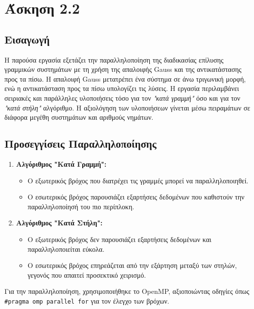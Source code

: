 \documentclass{article}
\begin{document}
\section*{Άσκηση 2.2}
\subsection*{Εισαγωγή} 
Η παρούσα εργασία εξετάζει την παραλληλοποίηση της διαδικασίας επίλυσης γραμμικών συστημάτων με τη χρήση της απαλοιφής Gauss και της αντικατάστασης προς τα πίσω. Η απαλοιφή Gauss μετατρέπει ένα σύστημα σε άνω τριγωνική μορφή, ενώ η αντικατάσταση προς τα πίσω υπολογίζει τις λύσεις. Η εργασία περιλαμβάνει σειριακές και παράλληλες υλοποιήσεις τόσο για τον \textit{"κατά γραμμή"} όσο και για τον \textit{"κατά στήλη"} αλγόριθμο. Η αξιολόγηση των υλοποιήσεων γίνεται μέσω πειραμάτων σε διάφορα μεγέθη συστημάτων και αριθμούς νημάτων.
\subsection*{Προσεγγίσεις Παραλληλοποίησης} 
\begin{enumerate} 
    \item \textbf{Αλγόριθμος "Κατά Γραμμή":} 
    \begin{itemize} 
        \item Ο εξωτερικός βρόχος που διατρέχει τις γραμμές μπορεί να παραλληλοποιηθεί. 
        \item Ο εσωτερικός βρόχος παρουσιάζει εξαρτήσεις δεδομένων που καθιστούν την παραλληλοποίησή του πιο περίπλοκη. 
    \end{itemize} 
    \item \textbf{Αλγόριθμος "Κατά Στήλη":} 
    \begin{itemize} 
        \item Ο εξωτερικός βρόχος δεν παρουσιάζει εξαρτήσεις δεδομένων και παραλληλοποιείται εύκολα. 
        \item Ο εσωτερικός βρόχος επηρεάζεται από την εξάρτηση μεταξύ των στηλών, γεγονός που απαιτεί προσεκτικό χειρισμό. 
    \end{itemize} 
\end{enumerate} 
Για την παραλληλοποίηση, χρησιμοποιήθηκε το OpenMP, αξιοποιώντας οδηγίες όπως \verb|#pragma omp parallel for| για τον έλεγχο των βρόχων.
\end{document}
